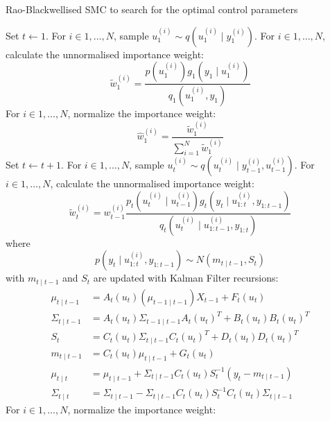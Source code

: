 \begin{algorithm}
\caption{Rao-Blackwellised SMC to search for the optimal control parameters}\label{algo:msmc}
\begin{algorithmic}[1]
\State Set $t \gets 1$.
\State For $i \in 1, \ldots, N$, sample $u^{(i)}_1 \sim q(u^{(i)}_1 \mid y^{(i)}_1)$.
\State For $i \in 1, \ldots, N$, calculate the unnormalised importance weight:
\begin{equation*}
 \tilde{w}^{(i)}_1 = \dfrac{p(u_1^{(i)})g_1(y_1 \mid u^{(i)}_1)}{q_1(u^{(i)}_1, y_1)}
\end{equation*}
\State For $i \in 1, \ldots, N$, normalize the importance weight:
\begin{equation*}
\hat{w}^{(i)}_1 = \dfrac{\tilde{w}^{(i)}_1}{\sum^N_{i=1} \tilde{w}^{(i)}_1}
\end{equation*}
\State Set $t \gets t + 1$.
\State For $i \in 1, \ldots, N$, sample $u^{(i)}_t \sim q(u^{(i)}_t \mid y^{(i)}_{t-1}, u^{(i)}_{t-1})$.
\State For $i \in 1, \ldots, N$, calculate the unnormalised importance weight:
\begin{equation*}
   \tilde{w}^{(i)}_t = w^{(i)}_{t-1} \dfrac{p_t(u^{(i)}_t \mid u^{(i)}_{t-1})g_t(y_t \mid u^{(i)}_{1:t}, y_{1:t-1})}{q_t(u^{(i)}_t \mid u^{(i)}_{1:t-1}, y_{1:t})}
\end{equation*}
where
\begin{equation}
  p(y_t \mid u^{(i)}_{1:t}, y_{1:t-1}) \sim N(m_{t \mid t-1},S_t)
\end{equation}
with $m_{t \mid t-1}$ and $S_t$ are updated with Kalman Filter recursions:
\begin{align}
  \mu_{t \mid t -1} &= A_{t}(u_t)(\mu_{t-1 \mid t-1})X_{t-1} + F_t(u_t) \nonumber \\
  \Sigma_{t \mid t -1} &= A_{t}(u_t)\Sigma_{t -1 \mid t -1}A_{t}(u_t)^T +  B_t(u_t)B_t(u_t)^T \nonumber\\
  S_t &=  C_{t}(u_t)\Sigma_{t \mid t -1}C_{t}(u_t)^T +  D_t(u_t)D_t(u_t)^T \nonumber\\
  m_{t \mid t-1} &=  C_{t}(u_t)  \mu_{t \mid t-1} + G_t(u_t) \nonumber\\
  \mu_{t \mid t} &=   \mu_{t \mid t -1} +   \Sigma_{t \mid t -1} C_{t}(u_t)S_t^{-1}(y_t - m_{t \mid t-1}) \nonumber\\
  \Sigma_{t \mid t} &=  \Sigma_{t \mid t -1} -\Sigma_{t \mid t -1} C_{t}(u_t)S_t^{-1} C_{t}(u_t)\Sigma_{t \nonumber \mid t -1}
\end{align}
\State For $i \in 1, \ldots, N$, normalize the importance weight:

\end{algorithmic}
\end{algorithm}
